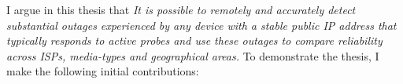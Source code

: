 






I argue in this thesis that 
\emph{It is possible to remotely and accurately detect substantial outages
  experienced by any device with a stable public IP address that typically
  responds to active probes and use these outages to compare
  reliability across ISPs, media-types and geographical areas.} To demonstrate the thesis, I make the following
initial contributions:



